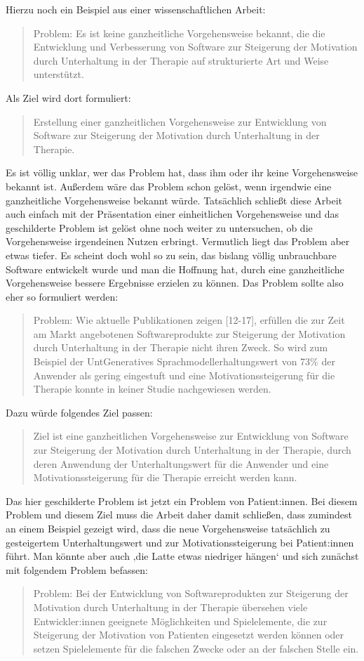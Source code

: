 Hierzu noch ein Beispiel aus einer wissenschaftlichen Arbeit:
\blockquote{Problem: Es ist keine ganzheitliche Vorgehensweise bekannt, die die Entwicklung und Verbesserung von Software zur Steigerung der Motivation durch Unterhaltung in der Therapie auf strukturierte Art und Weise unterstützt.}
Als Ziel wird dort formuliert:
\blockquote{Erstellung einer ganzheitlichen Vorgehensweise zur Entwicklung von Software zur Steigerung der Motivation durch Unterhaltung in der Therapie.}
Es ist völlig unklar, wer das Problem hat, dass ihm oder ihr keine Vorgehensweise bekannt ist.
Außerdem wäre das Problem schon gelöst, wenn irgendwie eine ganzheitliche Vorgehensweise bekannt würde.
Tatsächlich schließt diese Arbeit auch einfach mit der Präsentation einer einheitlichen Vorgehensweise und das geschilderte Problem ist gelöst ohne noch weiter zu untersuchen, ob die Vorgehensweise irgendeinen Nutzen erbringt.
Vermutlich liegt das Problem aber etwas tiefer.
Es scheint doch wohl so zu sein, das bislang völlig unbrauchbare Software entwickelt wurde und man die Hoffnung hat, durch eine ganzheitliche Vorgehensweise bessere Ergebnisse erzielen zu können.
Das Problem sollte also eher so formuliert werden:
\blockquote{Problem: Wie aktuelle Publikationen zeigen [12-17], erfüllen die zur Zeit am Markt angebotenen  Softwareprodukte zur Steigerung der Motivation durch Unterhaltung in der Therapie nicht ihren Zweck.
So wird zum Beispiel der UntGeneratives Sprachmodellerhaltungswert von 73\% der Anwender als gering eingestuft und eine Motivationssteigerung für die Therapie konnte in keiner Studie nachgewiesen werden.}
Dazu würde folgendes Ziel passen:
\blockquote{Ziel ist eine ganzheitlichen Vorgehensweise zur Entwicklung von Software zur Steigerung der Motivation durch Unterhaltung in der Therapie, durch deren Anwendung der Unterhaltungswert für die Anwender und eine Motivationssteigerung für die Therapie erreicht werden kann.}
Das hier geschilderte Problem ist jetzt ein Problem von Patient:innen.
Bei diesem Problem und diesem Ziel muss die Arbeit daher damit schließen, dass zumindest an einem Beispiel gezeigt wird, dass die neue Vorgehensweise tatsächlich zu gesteigertem Unterhaltungswert und zur Motivationssteigerung bei Patient:innen führt.
Man könnte aber auch ‚die Latte etwas niedriger hängen‘ und sich zunächst mit folgendem Problem befassen:
\blockquote{Problem: Bei der Entwicklung von Softwareprodukten zur Steigerung der Motivation durch Unterhaltung in der Therapie übersehen viele Entwickler:innen geeignete Möglichkeiten und Spielelemente, die zur Steigerung der Motivation von Patienten eingesetzt werden können oder setzen Spielelemente für die falschen Zwecke oder an der falschen Stelle ein.}
